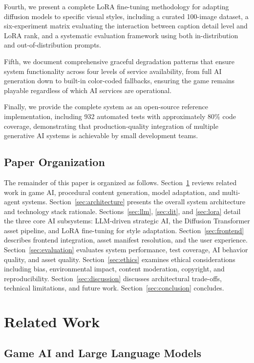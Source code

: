 \documentclass[conference]{IEEEtran}
\begin{document}
Fourth, we present a complete LoRA fine-tuning methodology for adapting diffusion models to specific visual styles, including a curated 100-image dataset, a six-experiment matrix evaluating the interaction between caption detail level and LoRA rank, and a systematic evaluation framework using both in-distribution and out-of-distribution prompts.

Fifth, we document comprehensive graceful degradation patterns that ensure system functionality across four levels of service availability, from full AI generation down to built-in color-coded fallbacks, ensuring the game remains playable regardless of which AI services are operational.

Finally, we provide the complete system as an open-source reference implementation, including 932 automated tests with approximately 80\% code coverage, demonstrating that production-quality integration of multiple generative AI systems is achievable by small development teams.

\subsection{Paper Organization}

The remainder of this paper is organized as follows. Section~\ref{sec:related} reviews related work in game AI, procedural content generation, model adaptation, and multi-agent systems. Section~\ref{sec:architecture} presents the overall system architecture and technology stack rationale. Sections~\ref{sec:llm}, \ref{sec:dit}, and \ref{sec:lora} detail the three core AI subsystems: LLM-driven strategic AI, the Diffusion Transformer asset pipeline, and LoRA fine-tuning for style adaptation. Section~\ref{sec:frontend} describes frontend integration, asset manifest resolution, and the user experience. Section~\ref{sec:evaluation} evaluates system performance, test coverage, AI behavior quality, and asset quality. Section~\ref{sec:ethics} examines ethical considerations including bias, environmental impact, content moderation, copyright, and reproducibility. Section~\ref{sec:discussion} discusses architectural trade-offs, technical limitations, and future work. Section~\ref{sec:conclusion} concludes.

\section{Related Work}
\label{sec:related}

\subsection{Game AI and Large Language Models}
\end{document}
